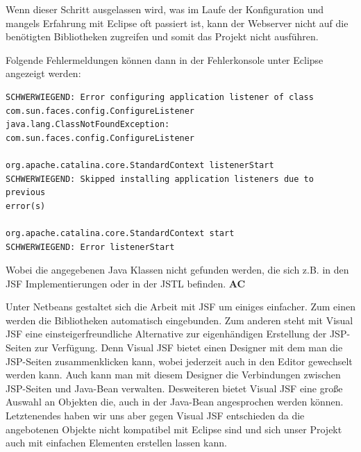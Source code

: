 \documentclass[titlepage, 12pt,a4paper]{scrartcl}
\begin{document}
Wenn dieser Schritt ausgelassen wird, was im Laufe der Konfiguration
und mangels Erfahrung mit Eclipse oft passiert ist, kann der Webserver nicht
auf die benötigten Bibliotheken zugreifen und somit das Projekt nicht
ausführen.

Folgende Fehlermeldungen können dann in der Fehlerkonsole unter Eclipse
angezeigt werden:


\begin{verbatim}
SCHWERWIEGEND: Error configuring application listener of class
com.sun.faces.config.ConfigureListener
java.lang.ClassNotFoundException: com.sun.faces.config.ConfigureListener

org.apache.catalina.core.StandardContext listenerStart
SCHWERWIEGEND: Skipped installing application listeners due to previous
error(s)

org.apache.catalina.core.StandardContext start
SCHWERWIEGEND: Error listenerStart

\end{verbatim}

Wobei die angegebenen Java Klassen nicht gefunden werden, die sich z.B. in den
JSF Implementierungen oder in der JSTL befinden. 
{\bf{AC}}

Unter Netbeans gestaltet sich die Arbeit mit JSF um einiges einfacher. 
Zum einen werden die Bibliotheken automatisch eingebunden. Zum anderen
steht mit Visual JSF eine einsteigerfreundliche Alternative zur eigenhändigen
Erstellung der JSP-Seiten zur Verfügung. Denn Visual JSF bietet einen Designer
mit dem man die JSP-Seiten zusammenklicken kann, wobei jederzeit auch in den 
Editor gewechselt werden kann. Auch kann man mit diesem Designer die Verbindungen
zwischen JSP-Seiten und Java-Bean verwalten. Desweiteren bietet Visual JSF eine
große Auswahl an Objekten die, auch in der Java-Bean angesprochen werden können.
Letztenendes haben wir uns aber gegen Visual JSF entschieden da die angebotenen
Objekte nicht kompatibel mit Eclipse sind und sich unser Projekt auch mit
einfachen Elementen erstellen lassen kann.
\end{document}
